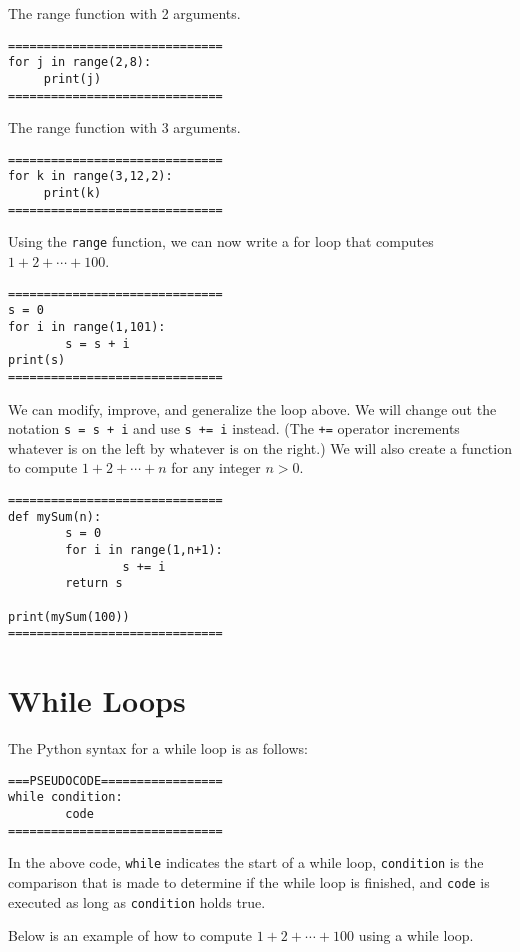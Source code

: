 \documentclass{ximera}
\begin{document}
The range function with 2 arguments.
\begin{verbatim}
==============================
for j in range(2,8):
     print(j)
==============================
\end{verbatim}

The range function with 3 arguments.
\begin{verbatim}
==============================
for k in range(3,12,2):
     print(k)
==============================
\end{verbatim}

Using the \verb|range| function, we can now write a for loop that computes $1+2+\cdots+100$.

\begin{verbatim}
==============================
s = 0
for i in range(1,101):
        s = s + i
print(s)
==============================
\end{verbatim}

We can modify, improve, and generalize the loop above. We will change out the notation \verb|s = s + i| and use \verb|s += i| instead. (The \verb|+=| operator increments whatever is on the left by whatever is on the right.) We will also create a function to compute $1+2+\cdots+n$ for any integer $n>0$.

\begin{verbatim}
==============================
def mySum(n):
        s = 0
        for i in range(1,n+1):
                s += i
        return s

print(mySum(100))
==============================
\end{verbatim}

\section{While Loops}

The Python syntax for a while loop is as follows:

\begin{verbatim}
===PSEUDOCODE=================
while condition:
        code
==============================
\end{verbatim}

In the above code, \verb|while| indicates the start of a while loop, \verb|condition| is the comparison that is made to determine if the while loop is finished, and \verb|code| is executed as long as \verb|condition| holds true.

Below is an example of how to compute $1+2+\cdots+100$ using a while loop.
\end{document}
